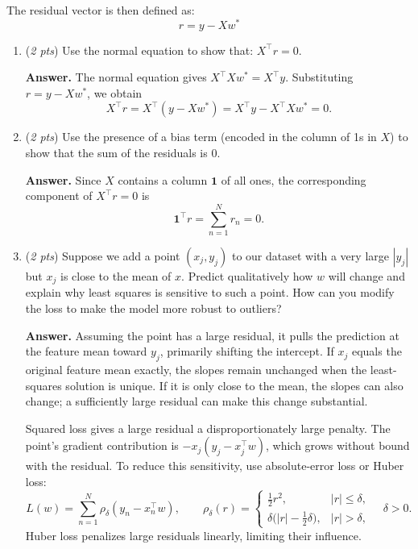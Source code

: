 \documentclass[11pt]{article}
\begin{document}
The residual vector is then defined as: 
\[
r = y - X w^\ast
\]

\begin{enumerate}[label=(\alph*)]
    \item (\textit{2 pts}) Use the normal equation to show that:  $X^\top r = 0$.

    \textbf{Answer.} The normal equation gives $X^\top Xw^\ast=X^\top y$.
    Substituting $r=y-Xw^\ast$, we obtain
    \[
        X^\top r=X^\top(y-Xw^\ast)
        =X^\top y-X^\top Xw^\ast=0.
    \]

    \item (\textit{2 pts}) Use the presence of a bias term (encoded in the column of 1s in $X$) to show that the sum of the residuals is 0.

    \textbf{Answer.} Since $X$ contains a column $\mathbf{1}$ of all ones,
    the corresponding component of $X^\top r=0$ is
    \[
        \mathbf{1}^\top r=\sum_{n=1}^N r_n=0.
    \]

    \item (\textit{2 pts}) Suppose we add a point $(x_j, y_j)$ to our dataset with a very large $|y_j|$ but $x_j$ is close to the mean of $x$.
    Predict qualitatively how $w$ will change and explain why least squares is sensitive to such a point.
    How can you modify the loss to make the model more robust to outliers?

    \textbf{Answer.} Assuming the point has a large residual, it pulls the
    prediction at the feature mean toward $y_j$, primarily shifting the
    intercept. If $x_j$ equals the original feature mean exactly, the slopes
    remain unchanged when the least-squares solution is unique. If it is only
    close to the mean, the slopes can also change; a sufficiently large residual
    can make this change substantial.

    Squared loss gives a large residual a disproportionately large penalty.
    The point's gradient contribution is
    $-x_j(y_j-x_j^\top w)$, which grows without bound with the residual.
    To reduce this sensitivity, use absolute-error loss or Huber loss:
    \[
        L(w)=\sum_{n=1}^N \rho_\delta(y_n-x_n^\top w),
        \qquad
        \rho_\delta(r)=
        \begin{cases}
            \frac12 r^2, & |r|\leq\delta,\\
            \delta\bigl(|r|-\frac12\delta\bigr), & |r|>\delta,
        \end{cases}
        \quad \delta>0.
    \]
    Huber loss penalizes large residuals linearly, limiting their influence.
\end{enumerate}
\end{document}

